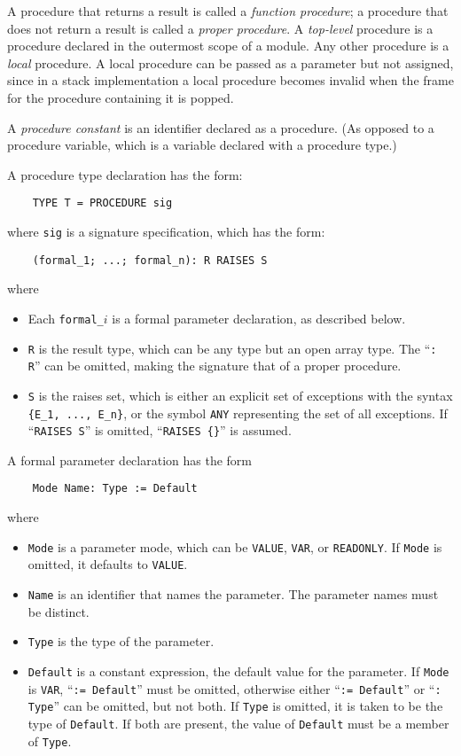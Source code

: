 \documentclass[10pt]{article}
\begin{document}
A procedure that returns a result is called a \emph{function procedure}; a
procedure that does not return a result is called a \emph{proper procedure}.
A \emph{top-level} procedure is a procedure declared in the outermost scope of
a module.  Any other procedure is a \emph{local} procedure.  A local procedure
can be passed as a parameter but not assigned, since in a stack implementation
a local procedure becomes invalid when the frame for the procedure containing
it is popped.

A \emph{procedure constant} is an identifier declared as a procedure.  (As
opposed to a procedure variable, which is a variable declared with a procedure
type.)

A procedure type declaration has the form:
\begin{verbatim}
    TYPE T = PROCEDURE sig
\end{verbatim}
where \verb|sig| is a signature specification, which has the form:
\begin{verbatim}
    (formal_1; ...; formal_n): R RAISES S
\end{verbatim}
where
\begin{itemize}
\item Each \verb|formal_|$i$ is a formal parameter declaration, as described
  below.
\item \verb|R| is the result type, which can be any type but an open array
  type.  The ``\verb|: R|'' can be omitted, making the signature that of a
  proper procedure.
\item \verb|S| is the raises set, which is either an explicit set of
  exceptions with the syntax \verb|{E_1, ..., E_n}|, or the symbol \verb|ANY|
  representing the set of all exceptions.  If ``\verb|RAISES S|'' is omitted,
  ``\verb|RAISES {}|'' is assumed.
\end{itemize}

A formal parameter declaration has the form
\begin{verbatim}
    Mode Name: Type := Default
\end{verbatim}
where
\begin{itemize}
\item \verb|Mode| is a parameter mode, which can be \verb|VALUE|, \verb|VAR|,
  or \verb|READONLY|.  If \verb|Mode| is omitted, it defaults to \verb|VALUE|.
\item \verb|Name| is an identifier that names the parameter.  The parameter
  names must be distinct.
\item \verb|Type| is the type of the parameter.
\item \verb|Default| is a constant expression, the default value for the
  parameter.  If \verb|Mode| is \verb|VAR|, ``\verb|:= Default|'' must be
  omitted, otherwise either ``\verb|:= Default|'' or ``\verb|: Type|'' can be
  omitted, but not both.  If \verb|Type| is omitted, it is taken to be the
  type of \verb|Default|. If both are present, the value of \verb|Default|
  must be a member of \verb|Type|.
\end{itemize}
\end{document}
